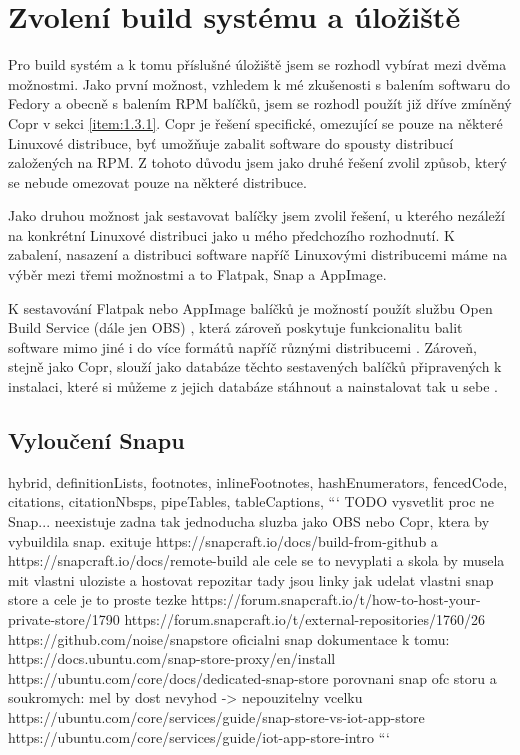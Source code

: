 \documentclass[
  digital,     %
  oneside,     %
  nosansbold,  %
  nocolorbold, %
  lof,         %
  lot,         %
]{fithesis4}
\begin{document}
\chapter{Zvolení build systému a úložiště}

Pro build systém a k tomu příslušné úložiště jsem se rozhodl vybírat mezi dvěma 
možnostmi. Jako první možnost, vzhledem k mé zkušenosti s balením softwaru do 
Fedory a obecně s balením RPM balíčků, jsem se rozhodl použít již dříve zmíněný 
Copr v sekci \ref{item:1.3.1}. Copr je řešení specifické, omezující se pouze na
některé Linuxové distribuce, byť umožňuje zabalit software do spousty distribucí
založených na RPM. Z tohoto důvodu jsem jako druhé řešení zvolil způsob, který
se nebude omezovat pouze na některé distribuce. 

Jako druhou možnost jak sestavovat balíčky jsem zvolil řešení, u kterého
nezáleží na konkrétní Linuxové distribuci jako u mého předchozího rozhodnutí.
K zabalení, nasazení a distribuci software napříč Linuxovými distribucemi
máme na výběr mezi třemi možnostmi a to Flatpak, Snap a AppImage.

K sestavování Flatpak nebo AppImage balíčků je možností použít službu Open
Build Service (dále jen OBS) \cite{obs}, která zároveň poskytuje funkcionalitu
balit software mimo jiné i do více formátů napříč různými distribucemi
\cite{obs_package_formats}. Zároveň, stejně jako Copr, slouží jako databáze
těchto sestavených balíčků připravených k instalaci, které si můžeme z jejich
databáze stáhnout a nainstalovat tak u sebe \cite{obs_flatpak}.


\section{Vyloučení Snapu}


\begin{markdown*}{%
  hybrid,
  definitionLists,
  footnotes,
  inlineFootnotes,
  hashEnumerators,
  fencedCode,
  citations,
  citationNbsps,
  pipeTables,
  tableCaptions,
}
```
TODO vysvetlit proc ne Snap... neexistuje zadna tak jednoducha sluzba jako OBS
nebo Copr, ktera by vybuildila snap. 
exituje https://snapcraft.io/docs/build-from-github a
https://snapcraft.io/docs/remote-build
ale cele se to nevyplati a skola by musela mit vlastni uloziste a hostovat repozitar
tady jsou linky jak udelat vlastni snap store a cele je to proste tezke
https://forum.snapcraft.io/t/how-to-host-your-private-store/1790
https://forum.snapcraft.io/t/external-repositories/1760/26
https://github.com/noise/snapstore
oficialni snap dokumentace k tomu:
https://docs.ubuntu.com/snap-store-proxy/en/install
https://ubuntu.com/core/docs/dedicated-snap-store
porovnani snap ofc storu a soukromych: mel by dost nevyhod -> nepouzitelny vcelku
https://ubuntu.com/core/services/guide/snap-store-vs-iot-app-store
https://ubuntu.com/core/services/guide/iot-app-store-intro
```
\end{markdown*}
\end{document}
